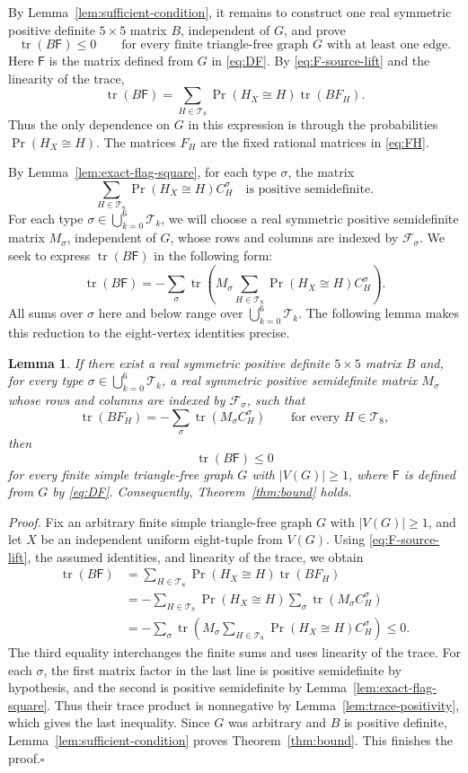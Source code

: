 \documentclass[11pt]{article}
\newcommand{\tr}{\operatorname{tr}}
\newtheorem{lemma}{Lemma}
\begin{document}
By Lemma~\ref{lem:sufficient-condition}, it remains to construct
one real symmetric positive definite $5\times5$ matrix $B$, independent of $G$,
and prove
\[
\tr(B\mathsf F)\leq0
\qquad\text{for every finite triangle-free graph }G\text{ with at least one edge}.
\]
Here $\mathsf F$ is the matrix defined from $G$ in \eqref{eq:DF}.
By \eqref{eq:F-source-lift} and the linearity of the trace,
\[
\tr(B\mathsf F)
=\sum_{H\in\mathcal T_8}\Pr(H_X\cong H)\tr(BF_H).
\]
Thus the only dependence on $G$ in this expression is through the probabilities
$\Pr(H_X\cong H)$.
The matrices $F_H$ are the fixed rational matrices in \eqref{eq:FH}.

By Lemma~\ref{lem:exact-flag-square}, for each type $\sigma$, the matrix
\[
\sum_{H\in\mathcal T_8}\Pr(H_X\cong H)C_H^\sigma
\quad\text{is positive semidefinite}.
\]
For each type $\sigma\in\bigcup_{k=0}^6\mathcal T_k$, we will choose a real
symmetric positive semidefinite matrix $M_\sigma$, independent of $G$,
whose rows and columns are indexed by $\mathcal F_\sigma$.
We seek to express $\tr(B\mathsf F)$ in the following form:
\[
\tr(B\mathsf F)
=-\sum_\sigma\tr\left(M_\sigma
\sum_{H\in\mathcal T_8}\Pr(H_X\cong H)C_H^\sigma\right).
\]
All sums over $\sigma$ here and below range over
$\bigcup_{k=0}^6\mathcal T_k$.
The following lemma makes this reduction to the eight-vertex identities precise.
\begin{lemma}\label{lem:finite-trace-reduction}
If there exist a real symmetric positive definite $5\times5$ matrix $B$
and, for every type $\sigma\in\bigcup_{k=0}^6\mathcal T_k$, a real symmetric
positive semidefinite matrix $M_\sigma$ whose rows and columns are indexed
by $\mathcal F_\sigma$, such that
\[
\tr(BF_H)
=-\sum_\sigma\tr(M_\sigma C_H^\sigma)
\qquad\text{for every }H\in\mathcal T_8,
\]
then
\[
\tr(B\mathsf F)\leq0
\]
for every finite simple triangle-free graph $G$ with $|V(G)|\geq1$,
where $\mathsf F$ is defined from $G$ by \eqref{eq:DF}.
Consequently, Theorem~\ref{thm:bound} holds.
\end{lemma}
\noindent\emph{Proof.}
Fix an arbitrary finite simple triangle-free graph $G$ with $|V(G)|\geq1$,
and let $X$ be an independent uniform eight-tuple from $V(G)$.
Using \eqref{eq:F-source-lift}, the assumed identities, and linearity of the trace,
we obtain
\begin{align*}
\tr(B\mathsf F)
&=\sum_{H\in\mathcal T_8}\Pr(H_X\cong H)\tr(BF_H)\\
&=-\sum_{H\in\mathcal T_8}\Pr(H_X\cong H)
\sum_\sigma\tr(M_\sigma C_H^\sigma)\\
&=-\sum_\sigma\tr\left(
M_\sigma
\sum_{H\in\mathcal T_8}\Pr(H_X\cong H)C_H^\sigma\right)
\leq0.
\end{align*}
The third equality interchanges the finite sums and uses linearity of the trace.
For each $\sigma$, the first matrix factor in the last line is positive
semidefinite by hypothesis, and the second is positive semidefinite by
Lemma~\ref{lem:exact-flag-square}.
Thus their trace product is nonnegative by Lemma~\ref{lem:trace-positivity},
which gives the last inequality.
Since $G$ was arbitrary and $B$ is positive definite,
Lemma~\ref{lem:sufficient-condition} proves Theorem~\ref{thm:bound}.
This finishes the proof.\hfill$\square$
\end{document}
